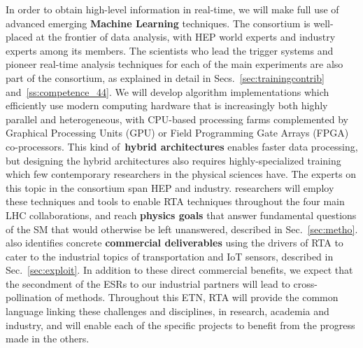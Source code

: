 In order to obtain high-level information in real-time, we will make full use of advanced emerging \textbf{Machine Learning} techniques. 
The consortium is well-placed at the frontier of data analysis, with HEP world experts 
and industry experts
among its members.
The scientists who lead the trigger systems and pioneer real-time analysis techniques for each of the main experiments are also part of the consortium, as explained in
detail in Secs.~\ref{sec:trainingcontrib} and~\ref{ss:competence_44}.
We will develop algorithm implementations which efficiently use modern computing hardware that is increasingly both highly parallel and heterogeneous, with CPU-based processing farms complemented by Graphical Processing Units (GPU) or Field Programming Gate Arrays (FPGA) co-processors. 
This kind of~\textbf{hybrid architectures} enables faster data processing, but designing the hybrid architectures also requires highly-specialized training which few contemporary researchers in the physical sciences have.
The experts on this topic in the consortium span HEP and industry.  
\acronym researchers will employ these techniques and tools to enable RTA techniques throughout the four main LHC collaborations, and reach \textbf{physics goals} that answer fundamental questions of the SM that would otherwise be left unanswered, described in Sec.~\ref{sec:metho}. 
\acronym also identifies concrete \textbf{commercial deliverables} using the drivers of RTA to cater to the industrial topics of transportation and IoT sensors, described in Sec.~\ref{sec:exploit}.
In addition to these direct commercial benefits, we expect that the secondment of the ESRs to our industrial partners will lead to cross-pollination of methods.
Throughout this ETN, RTA will provide the common language linking these challenges and disciplines, in research, academia and industry, and will enable each of the specific projects to benefit from the progress made in the others.
\vskip2pt
